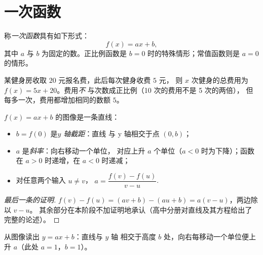 \section{一次函数}

\begin{definition}[一次函数]\label{def:g9:linfunc:affine}
称\emph{一次函数}具有如下形式：
\[
f(x) = a x + b ,
\]
其中 $a$ 与 $b$ 为固定的数。正比例函数是
$b = 0$ 时的特殊情形；常值函数则是 $a = 0$ 的情形。
\end{definition}

\begin{example}
某健身房收取 $20$ 元报名费，此后每次健身收费 $5$ 元，
则 $x$ 次健身的总费用为 $f(x) = 5x + 20$。费用\emph{不}
与次数成正比例（10 次的费用不是 5 次的两倍），
但每多一次，费用都增加相同的数额 $5$。
\end{example}

\begin{proposition}[一次函数的图像]\label{prop:g9:linfunc:affinegraph}
$f(x) = ax + b$ 的图像是一条直线：
\begin{itemize}
  \item $b = f(0)$ 是\emph{$y$ 轴截距}：直线
        与 y 轴相交于点 $(0, b)$；
  \item $a$ 是\emph{斜率}：向右移动一个单位，
        对应上升 $a$ 个单位（$a < 0$ 时为下降）；函数
        在 $a > 0$ 时递增，在 $a < 0$ 时递减；
  \item 对任意两个输入 $u \neq v$，
        $a = \dfrac{f(v) - f(u)}{v - u}$.
\end{itemize}
\end{proposition}

\begin{proof}[最后一条的证明]
$f(v) - f(u) = (av + b) - (au + b) = a(v - u)$，两边除以 $v - u$。
其余部分在本阶段不加证明地承认（高中分册对直线及其方程给出了
完整的论述）。
\end{proof}

\begin{omfigure}

{\small 从图像读出 $y = ax + b$：直线与 $y$ 轴
相交于高度 $b$ 处，向右每移动一个单位便上升 $a$（此处
$a = 1$，$b = 1$）。}
\end{omfigure}

